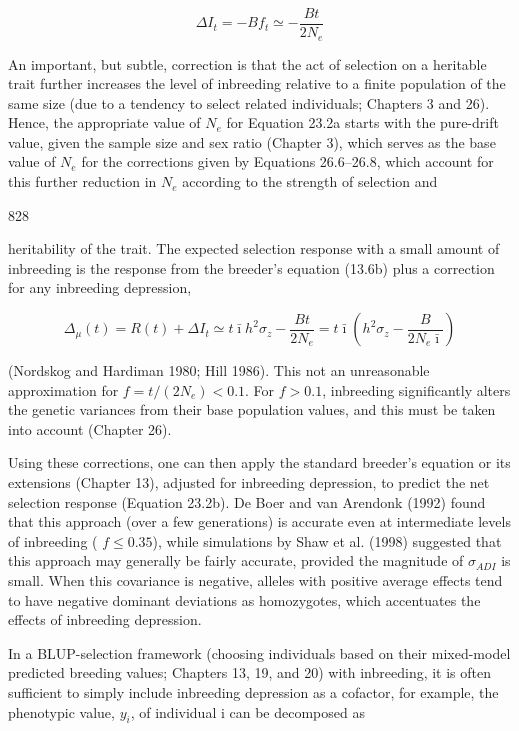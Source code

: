 \documentclass{article}
\begin{document}
\begin{equation}
\Delta I_{t}=-B f_{t}\simeq-\frac{B t}{2N_{e}}
\tag{23.2a}
\label{eq:23_2a}
\end{equation}

An important, but subtle, correction is that the act of selection on a heritable trait further increases the level of inbreeding relative to a finite population of the same size (due to a tendency to select related individuals; Chapters 3 and 26). Hence, the appropriate value of  $ N_e $ for Equation 23.2a starts with the pure-drift value, given the sample size and sex ratio (Chapter 3), which serves as the base value of  $ N_e $ for the corrections given by Equations 26.6–26.8, which account for this further reduction in  $ N_e $ according to the strength of selection and

828

heritability of the trait. The expected selection response with a small amount of inbreeding is the response from the breeder's equation (13.6b) plus a correction for any inbreeding depression,

\begin{equation}
\Delta_{\mu}(t)=R(t)+\Delta I_{t}\simeq t\bar{\imath}h^{2}\sigma_{z}-\frac{B t}{2N_{e}}=t\bar{\imath}\left(h^{2}\sigma_{z}-\frac{B}{2N_{e}\bar{\imath}}\right)
\tag{23.2b}
\label{eq:23_2b}
\end{equation}

(Nordskog and Hardiman 1980; Hill 1986). This not an unreasonable approximation for  $ f = t/(2N_e) < 0.1 $. For  $ f > 0.1 $, inbreeding significantly alters the genetic variances from their base population values, and this must be taken into account (Chapter 26).

Using these corrections, one can then apply the standard breeder's equation or its extensions (Chapter 13), adjusted for inbreeding depression, to predict the net selection response (Equation 23.2b). De Boer and van Arendonk (1992) found that this approach (over a few generations) is accurate even at intermediate levels of inbreeding ( $ f \leq 0.35 $), while simulations by Shaw et al. (1998) suggested that this approach may generally be fairly accurate, provided the magnitude of  $ \sigma_{ADI} $ is small. When this covariance is negative, alleles with positive average effects tend to have negative dominant deviations as homozygotes, which accentuates the effects of inbreeding depression.

In a BLUP-selection framework (choosing individuals based on their mixed-model predicted breeding values; Chapters 13, 19, and 20) with inbreeding, it is often sufficient to simply include inbreeding depression as a cofactor, for example, the phenotypic value,  $ y_{i} $, of individual i can be decomposed as
\end{document}
